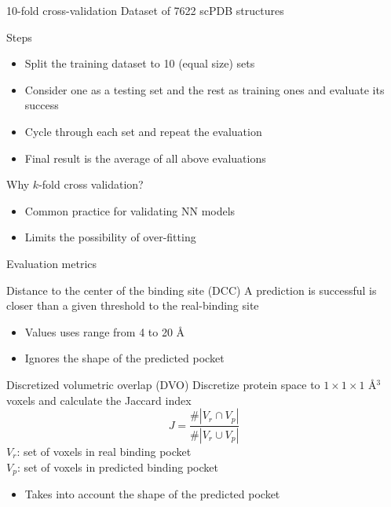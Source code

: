 \documentclass{beamer}
\begin{document}
\begin{frame}{10-fold cross-validation}
  Dataset of 7622 scPDB structures
  \begin{block}{Steps}
    \begin{itemize}
      \item Split the training dataset to 10 (equal size) sets
      \item Consider one as a testing set and the rest as training ones and evaluate its success
      \item Cycle through each set and repeat the evaluation
      \item Final result is the average of all above evaluations
    \end{itemize}
  \end{block}
  \begin{block}{Why $k$-fold cross validation?}
    \begin{itemize}
      \item Common practice for validating NN models
      \item Limits the possibility of over-fitting
    \end{itemize}
  \end{block}
\end{frame}

\begin{frame}{Evaluation metrics}
  \begin{block}{Distance to the center of the binding site (DCC)}
    A prediction is successful is closer than a given threshold to the real-binding site
    \begin{itemize}
      \item Values uses range from 4 to 20 \AA
      \item Ignores the shape of the predicted pocket
    \end{itemize}
  \end{block}
  \begin{block}{Discretized volumetric overlap (DVO)}
    Discretize protein space to $1 \times 1 \times 1$ \AA$^3$ voxels and calculate the Jaccard index
    \[
      J = \frac{\#|V_r \cap V_p|}{\#|V_r \cup V_p|}
    \]
    $V_r$: set of voxels in real binding pocket\\
    $V_p$: set of voxels in predicted binding pocket
    \begin{itemize}
      \item Takes into account the shape of the predicted pocket
    \end{itemize}
  \end{block}
\end{frame}
\end{document}
